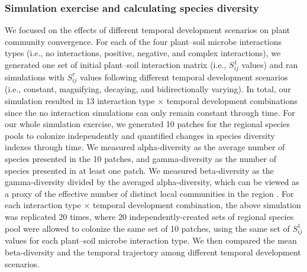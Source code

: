 \subsubsection*{Simulation exercise and calculating species diversity}
We focused on the effects of different temporal development scenarios on plant community convergence.
For each of the four plant--soil microbe interactions types (i.e., no interactions, positive, negative, and complex interactions), we generated one set of initial plant--soil interaction matrix (i.e., $S_{ij}^{1}$ values) and ran simulations with $S_{ij}^{\tau}$ values following different temporal development scenarios (i.e., constant, magnifying, decaying, and bidirectionally varying).
In total, our simulation resulted in 13 interaction type $\times$ temporal development combinations since the no interaction simulations can only remain constant through time.
For our whole simulation exercise, we generated 10 patches for the regional species pools to colonize independently and quantified changes in species diversity indexes through time. 
We measured alpha-diversity as the average number of species presented in the 10 patches, and gamma-diversity as the number of species presented in at least one patch. We measured beta-diversity as the gamma-diversity divided by the averaged alpha-diversity, which can be viewed as a proxy of the effective number of distinct local communities in the region \citep{FukamiNakajima2011}.
For each interaction type $\times$ temporal development combination, the above simulation was replicated 20 times, where 20 independently-created sets of regional species pool were allowed to colonize the same set of 10 patches, using the same set of $S_{ij}^{1}$ values for each plant--soil microbe interaction type. We then compared the mean beta-diversity and the temporal trajectory among different temporal development scenarios.
\par



\clearpage
